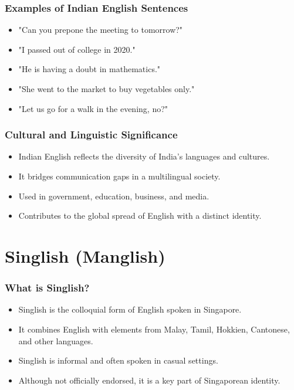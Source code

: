 \documentclass{beamer}
\begin{document}
\begin{frame}
\frametitle{Examples of Indian English Sentences}
\begin{itemize}
    \item "Can you prepone the meeting to tomorrow?"
    \item "I passed out of college in 2020."
    \item "He is having a doubt in mathematics."
    \item "She went to the market to buy vegetables only."
    \item "Let us go for a walk in the evening, no?"
\end{itemize}
\end{frame}

\begin{frame}
\frametitle{Cultural and Linguistic Significance}
\begin{itemize}
    \item Indian English reflects the diversity of India's languages and cultures.
    \item It bridges communication gaps in a multilingual society.
    \item Used in government, education, business, and media.
    \item Contributes to the global spread of English with a distinct identity.
\end{itemize}
\end{frame}


\section{Singlish (Manglish)}


\begin{frame}
\frametitle{What is Singlish?}
\begin{itemize}
    \item Singlish is the colloquial form of English spoken in Singapore.
    \item It combines English with elements from Malay, Tamil, Hokkien, Cantonese, and other languages.
    \item Singlish is informal and often spoken in casual settings.
    \item Although not officially endorsed, it is a key part of Singaporean identity.
\end{itemize}
\end{frame}
\end{document}
